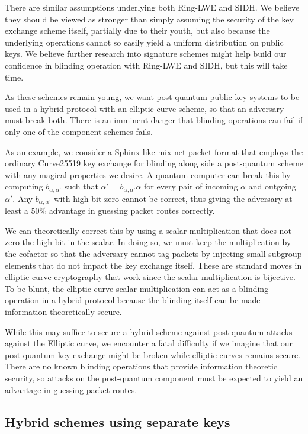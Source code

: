 There are similar assumptions underlying both Ring-LWE and SIDH.
We believe they should be viewed as stronger than simply assuming the
security of the key exchange scheme itself, partially due to their
youth, but also because the underlying operations cannot so easily
yield a uniform distribution on public keys.  We believe further
research into signature schemes might help build our confidence in
blinding operation with Ring-LWE and SIDH, but this will take time.

As these schemes remain young, we want post-quantum public key
systems to be used in a hybrid protocol with an elliptic curve scheme,
so that an adversary must break both.  There is an imminent danger
that blinding operations can fail if only one of the component schemes
fails.

As an example, we consider a Sphinx-like mix net packet format that
employs the ordinary Curve25519 key exchange for blinding along side
a post-quantum scheme with any magical properties we desire.  
A quantum computer can break this by computing $b_{\alpha,\alpha'}$
such that $\alpha' = b_{\alpha,\alpha'} \alpha$ for every pair of
incoming $\alpha$ and outgoing $\alpha'$.  Any $b_{\alpha,\alpha'}$
with high bit zero cannot be correct, thus giving the adversary at
least a 50\% advantage in guessing packet routes correctly.

We can theoretically correct this by using a scalar multiplication that does not
zero the high bit in the scalar.  In doing so, we must keep the
multiplication by the cofactor so that the adversary cannot tag
packets by injecting small subgroup elements that do not impact the
key exchange itself.  These are standard moves in elliptic curve 
cryptography that work since the scalar multiplication is bijective.
To be blunt, the elliptic curve scalar multiplication can act as
a blinding operation in a hybrid protocol because the blinding itself
can be made information theoretically secure.

While this may suffice to secure a hybrid scheme against post-quantum
attacks against the Elliptic curve, we encounter a fatal difficulty
if we imagine that our post-quantum key 
exchange might be broken while elliptic curves remains secure.  
There are no known blinding operations that provide information
theoretic security, so attacks on the post-quantum component must be
expected to yield an advantage in guessing packet routes.


\subsection{Hybrid schemes using separate keys}

